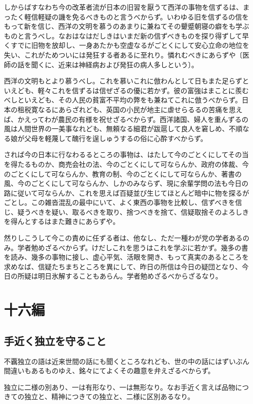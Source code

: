 \documentclass[a4paper, platex, dvipdfmx]{jsarticle}
\begin{document}
しからばすなわち今の改革者流が日本の旧習を厭うて西洋の事物を信ずるは、まったく軽信軽疑の譏を免るべきものと言うべからず。いわゆる旧を信ずるの信をもって新を信じ、西洋の文明を慕うのあまりに兼ねてその顰蹙朝寝の癖をも学ぶものと言うべし。なおはなはだしきはいまだ新の信ずべきものを探り得ずして早くすでに旧物を放却し、一身あたかも空虚なるがごとくにして安心立命の地位を失い、これがためついには発狂する者あるに至れり。憐れむべきにあらずや〔医師の話を聞くに、近来は神経病および発狂の病人多しという〕。

西洋の文明もとより慕うべし。これを慕いこれに倣わんとして日もまた足らずといえども、軽々これを信ずるは信ぜざるの優に若かず。彼の富強はまことに羨むべしといえども、その人民の貧富不平均の弊をも兼ねてこれに倣うべからず。日本の租税寛なるにあらざれども、英国の小民が地主に虐せらるるの苦痛を思えば、かえってわが農民の有様を祝せざるべからず。西洋諸国、婦人を重んずるの風は人間世界の一美事なれども、無頼なる細君が跋扈して良人を窘しめ、不順なる娘が父母を軽蔑して醜行を逞しゅうするの俗に心酔すべからず。

されば今の日本に行なわるるところの事物は、はたして今のごとくにしてその当を得たるものか、商売会社の法、今のごとくにして可ならんか、政府の体裁、今のごとくにして可ならんか、教育の制、今のごとくにして可ならんか、著書の風、今のごとくにして可ならんか、しかのみならず、現に余輩学問の法も今日の路に従いて可ならんか、これを思えば百疑並び生じてほとんど暗中に物を探るがごとし。この雑沓混乱の最中にいて、よく東西の事物を比較し、信ずべきを信じ、疑うべきを疑い、取るべきを取り、捨つべきを捨て、信疑取捨そのよろしきを得んとするはまた難きにあらずや。

然りしこうして今この責めに任ずる者は、他なし、ただ一種わが党の学者あるのみ。学者勉めざるべからず。けだしこれを思うはこれを学ぶに若かず。幾多の書を読み、幾多の事物に接し、虚心平気、活眼を開き、もって真実のあるところを求めなば、信疑たちまちところを異にして、昨日の所信は今日の疑団となり、今日の所疑は明日氷解することもあらん。学者勉めざるべからざるなり。

\section{十六編}
\subsection{手近く独立を守ること}
不覊独立の語は近来世間の話にも聞くところなれども、世の中の話にはずいぶん間違いもあるものゆえ、銘々にてよくその趣意を弁えざるべからず。

独立に二様の別あり、一は有形なり、一は無形なり。なお手近く言えば品物につきての独立と、精神につきての独立と、二様に区別あるなり。
\end{document}
